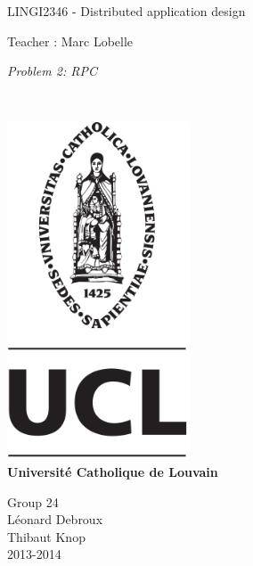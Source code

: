 \documentclass{article}
\begin{document}
\begin{titlepage}
    \begin{center}
        {\huge LINGI2346 - Distributed application design}\\
        \vspace{0.4cm}
        
        {\Large {Teacher : Marc Lobelle}}\\
        \vspace{0.6cm}
        
        {\Large \textit{Problem 2: RPC}}\\
        \vspace{1.2cm}

        \texttt{}\\
        \vspace{0.2cm}

        \includegraphics[height=10cm]{pageGarde.png}\\
        \vspace{0.1cm}
        {\Large \textbf{Universit\'e Catholique de Louvain}}
        \vspace{0.3cm}

        \vspace{2cm}
        Group 24\\
        \vspace{0.3cm}
        Léonard Debroux\\
        Thibaut Knop\\
        \vspace{0.4cm}
        2013-2014\\
    \end{center}
\end{titlepage}
\end{document}
